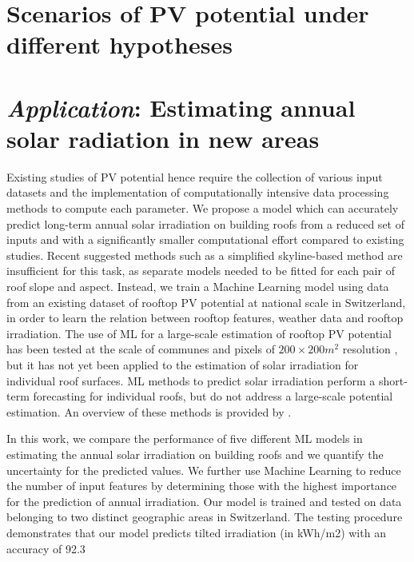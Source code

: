 
\section{Scenarios of PV potential under different hypotheses}
\label{solar_scenarios}


\section{\textit{Application}: Estimating annual solar radiation in new areas}
\label{solar_application}
Existing studies of PV potential hence require the collection of various input datasets and the implementation of computationally intensive data processing methods to compute each parameter. We propose a model which can accurately predict long-term annual solar irradiation on building roofs from a reduced set of inputs and with a significantly smaller computational effort compared to existing studies. Recent suggested methods such as a simplified skyline-based method \cite{calcabrini_simplified_2019} are insufficient for this task, as separate models needed to be fitted for each pair of roof slope and aspect. Instead, we train a Machine Learning model using data from an existing dataset of rooftop PV potential at national scale in Switzerland, in order to learn the relation between rooftop features, weather data and rooftop irradiation. The use of ML for a large-scale estimation of rooftop PV potential has been tested at the scale of communes \cite{assouline_quantifying_2017} and pixels of $200 \times 200m^2$ resolution \cite{assouline_large-scale_2018}, but it has not yet been applied to the estimation of solar irradiation for individual roof surfaces. ML methods to predict solar irradiation perform a short-term forecasting for individual roofs, but do not address a large-scale potential estimation. An overview of these methods is provided by \citet{voyant_machine_2017}. 

In this work, we compare the performance of five different ML models in estimating the annual solar irradiation on building roofs and we quantify the uncertainty for the predicted values. We further use Machine Learning to reduce the number of input features by determining those with the highest importance for the prediction of annual irradiation. Our model is trained and tested on data belonging to two distinct geographic areas in Switzerland. The testing procedure demonstrates that our model predicts tilted irradiation (in kWh/m2) with an accuracy of 92.3%

